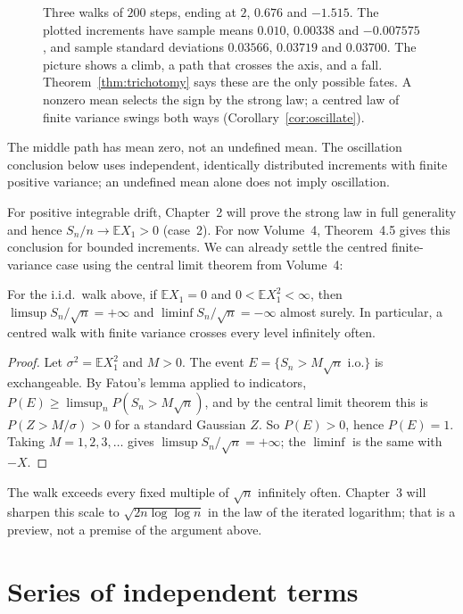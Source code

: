 \begin{figure}[ht]
\centering{}
\caption{Three walks of $200$ steps, ending at $2$, $0.676$ and $-1.515$. The plotted increments have sample means $0.010$, $0.00338$ and $-0.007575$, and sample standard deviations $0.03566$, $0.03719$ and $0.03700$. The picture shows a climb, a path that crosses the axis, and a fall. Theorem~\ref{thm:trichotomy} says these are the only possible fates. A nonzero mean selects the sign by the strong law; a centred law of finite variance swings both ways (Corollary~\ref{cor:oscillate}).}
\label{fig:trichotomy}
\end{figure}

The middle path has mean zero, not an undefined mean. The oscillation conclusion below uses independent, identically distributed increments with finite positive variance; an undefined mean alone does not imply oscillation.

For positive integrable drift, Chapter~2 will prove the strong law in full generality and hence $S_n/n\to\mathbb E X_1>0$ (case~2). For now Volume~4, Theorem~4.5 gives this conclusion for bounded increments. We can already settle the centred finite-variance case using the central limit theorem from Volume~4:

\begin{corollary}\label{cor:oscillate}
For the i.i.d.\ walk above, if $\mathbb E X_1=0$ and $0<\mathbb E X_1^2<\infty$, then $\limsup S_n/\sqrt n=+\infty$ and $\liminf S_n/\sqrt n=-\infty$
almost surely. In particular, a centred walk with finite variance crosses every level infinitely often.
\end{corollary}
\begin{proof}
Let $\sigma^2=\mathbb E X_1^2$ and $M>0$. The event $E=\{S_n>M\sqrt n\text{ i.o.}\}$ is exchangeable. By Fatou's lemma applied to
indicators, $P(E)\ge\limsup_nP(S_n>M\sqrt n)$, and by the central limit theorem this is $P(Z>M/\sigma)>0$ for a standard
Gaussian $Z$. So $P(E)>0$, hence $P(E)=1$. Taking $M=1,2,3,\dots$ gives $\limsup S_n/\sqrt n=+\infty$; the $\liminf$ is the
same with $-X$.
\end{proof}

The walk exceeds every fixed multiple of $\sqrt n$ infinitely often. Chapter~3 will sharpen this scale to $\sqrt{2n\log\log n}$ in the law of the iterated logarithm; that is a preview, not a premise of the argument above.

\section{Series of independent terms}

